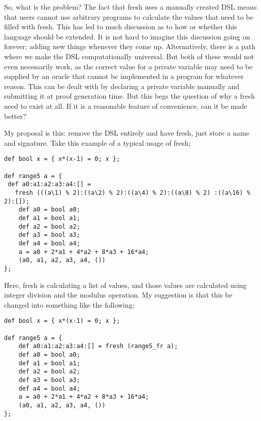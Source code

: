 \documentclass[
    9pt,            
    techreport,       
    affiltop,       
]{art}
\begin{document}
So, what is the problem? The fact that fresh uses a manually created DSL means that users cannot use arbitrary programs to calculate the values that need to be filled with fresh. This has led to much discussion as to how or whether this language should be extended. It is not hard to imagine this discussion going on forever; adding new things whenever they come up. Alternatively, there is a path where we make the DSL computationally universal. But both of these would not even necessarily work, as the correct value for a private variable may need to be supplied by an oracle that cannot be implemented in a \VampIR{} program for whatever reason. This can be dealt with by declaring a private variable manually and submitting it at proof generation time. But this begs the question of why a fresh need to exist at all. If it is a reasonable feature of convenience, can it be made better?

My proposal is this: remove the DSL entirely and have fresh, just store a name and signature. Take this example of a typical usage of fresh;


\begin{verbatim}
def bool x = { x*(x-1) = 0; x };

def range5 a = {
 def a0:a1:a2:a3:a4:[] =
   fresh (((a\1) % 2):((a\2) % 2):((a\4) % 2):((a\8) % 2) :((a\16) % 2):[]);
    def a0 = bool a0;
    def a1 = bool a1;
    def a2 = bool a2;
    def a3 = bool a3;
    def a4 = bool a4;
    a = a0 + 2*a1 + 4*a2 + 8*a3 + 16*a4;
    (a0, a1, a2, a3, a4, ())
};
\end{verbatim}

Here, fresh is calculating a list of values, and those values are calculated using integer division and the modulus operation. My suggestion is that this be changed into something like the following;

\begin{verbatim}
def bool x = { x*(x-1) = 0; x };

def range5 a = {
    def a0:a1:a2:a3:a4:[] = fresh (range5_fr a);
    def a0 = bool a0;
    def a1 = bool a1;
    def a2 = bool a2;
    def a3 = bool a3;
    def a4 = bool a4;
    a = a0 + 2*a1 + 4*a2 + 8*a3 + 16*a4;
    (a0, a1, a2, a3, a4, ())
};
\end{verbatim}
\end{document}
